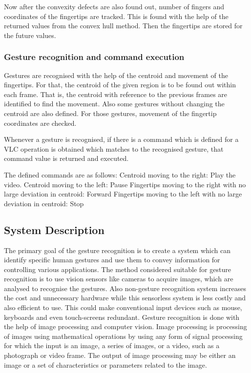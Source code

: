 \documentclass[a4paper,11pt]{article}
\begin{document}
				Now after the convexity defects are also found out, number of fingers and coordinates of the fingertips are tracked. This is found with the help of the returned values from the convex hull method. Then the fingertips are stored for the future values.
			\subsubsection{Gesture recognition and command execution}
				Gestures are recognised with the help of the centroid and movement of the fingertips. For that, the centroid of the given region is to be found out within each frame. That is, the centroid with reference to the previous frames are identified to find the movement. Also some gestures without changing the centroid are also defined. For those gestures, movement of the fingertip coordinates are checked. 

				Whenever a gesture is recognised, if there is a command which is defined for a VLC operation is obtained which matches to the recognised gesture, that command value is returned and executed.

				The defined commands are as follows:
				Centroid moving to the right: Play the video.
				Centroid moving to the left: Pause
				Fingertips moving to the right with no large deviation in centroid: Forward
				Fingertips moving to the left with no large deviation in centroid: Stop

			 \subsection{System Description}

			 	The primary goal of the gesture recognition is to create a system which can identify
specific human gestures and use them to convey information for controlling various applications. The method considered suitable for gesture recognition is to use
vision sensors like cameras to acquire images, which are analysed to recognise the gestures.
Also non-gesture recognition system increases the cost and unnecessary hardware while
this sensorless system is less costly and also efficient to use. This could make conventional
input devices such as mouse, keyboards and even touch-screens redundant.
			 	Gesture recognition is done with the help of image processing and computer vision. Image processing is processing of images using mathematical operations by using any form of signal processing for which the input is an image, a series of images, or a video, such as a photograph or video frame. The output of image processing may be either an image or a set of characteristics or parameters related to the image.
\end{document}
